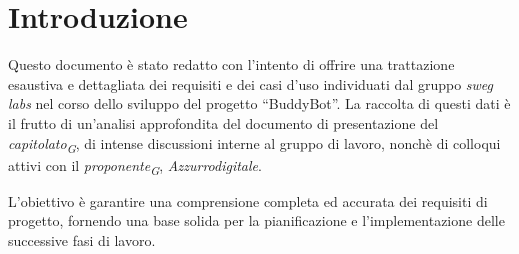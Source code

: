 

\section{Introduzione}
Questo documento è stato redatto con l'intento di offrire una trattazione esaustiva e dettagliata 
dei requisiti e dei casi d'uso individuati dal gruppo \textit{sweg labs} nel corso dello sviluppo
del progetto “BuddyBot”. La raccolta di questi dati è il frutto di un'analisi approfondita
del documento di presentazione del \textit{capitolato\textsubscript{G}}, di intense discussioni interne al gruppo di lavoro, 
nonchè di colloqui attivi con il \textit{proponente\textsubscript{G}}, \textit{Azzurrodigitale}.

L'obiettivo è garantire una comprensione completa ed accurata dei requisiti di progetto,
fornendo una base solida per la pianificazione e l'implementazione delle successive fasi di lavoro.

